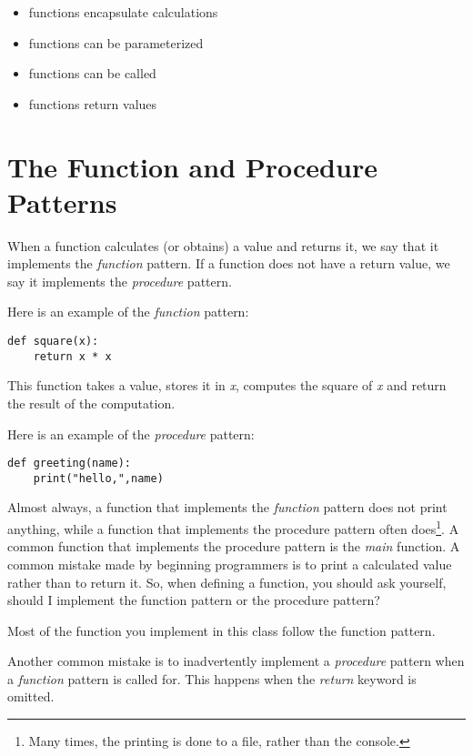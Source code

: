 \begin{itemize}
\item
    functions encapsulate calculations
\item
    functions can be parameterized
\item
    functions can be called
\item
    functions return values
\end{itemize}

\section{The Function and Procedure Patterns}

When a function calculates (or obtains) a value and returns it, we say
that it implements the {\it function} pattern. If a function
does not have a return value, we say it implements the
{\it procedure} pattern.

Here is an example of the {\it function} pattern:

\begin{verbatim}
def square(x):
    return x * x
\end{verbatim}

This function takes a value, stores it in {\it x}, computes the square
of {\it x} and return the result of the computation.

Here is an example of the {\it procedure} pattern:

\begin{verbatim}
def greeting(name):
    print("hello,",name)
\end{verbatim}

Almost always,
a function that implements the {\it function} pattern does not print
anything, while a function that implements the procedure
pattern often does\footnote{Many times, the printing is
done to a file, rather than  the console.}.
A common function that implements the procedure pattern
is the {\it main} function.
A common mistake made by beginning programmers is
to print a calculated value rather than to return it. So, when defining
a function, you should ask yourself, should I implement the function
pattern or the procedure pattern?

Most of the function you implement in this class follow the function
pattern.

Another common mistake is to inadvertently implement a {\it procedure} pattern
when a {\it function} pattern is called for. This happens when the {\it return}
keyword is omitted.

